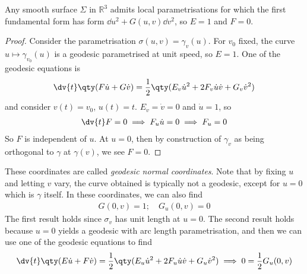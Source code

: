 \begin{corollary}
	Any smooth surface $\Sigma$ in $\mathbb R^3$ admits local parametrisations for which the first fundamental form has form $\dd{u}^2 + G(u,v) \dd{v}^2$, so $E = 1$ and $F = 0$.
\end{corollary}
\begin{proof}
	Consider the parametrisation $\sigma(u,v) = \gamma_v(u)$.
	For $v_0$ fixed, the curve $u \mapsto \gamma_{v_0}(u)$ is a geodesic parametrised at unit speed, so $E = 1$.
	One of the geodesic equations is
	\begin{align*}
		\dv{t} \qty(F \dot u + G \dot v) = \frac{1}{2} \qty(E_v \dot u^2 + 2F_v \dot u \dot v + G_v \dot v^2)
	\end{align*}
	and consider $v(t) = v_0$, $u(t) = t$.
	$E_v = \dot v = 0$ and $\dot u = 1$, so
	\begin{align*}
		\dv{t} F = 0 \implies F_u \dot u = 0 \implies F_u = 0
	\end{align*}
	So $F$ is independent of $u$.
	At $u = 0$, then by construction of $\gamma_v$ as being orthogonal to $\gamma$ at $\gamma(v)$, we see $F = 0$.
\end{proof}
These coordinates are called \textit{geodesic normal coordinates}.
Note that by fixing $u$ and letting $v$ vary, the curve obtained is typically not a geodesic, except for $u = 0$ which is $\gamma$ itself.
In these coordinates, we can also find
\begin{align*}
	G(0,v) = 1;\quad G_u(0,v) = 0
\end{align*}
The first result holds since $\sigma_v$ has unit length at $u = 0$.
The second result holds because $u = 0$ yields a geodesic with arc length parametrisation, and then we can use one of the geodesic equations to find
\begin{align*}
	\dv{t} \qty(E \dot u + F \dot v) = \frac{1}{2}\qty(E_u \dot u^2 + 2F_u \dot u \dot v + G_u \dot v^2) \implies 0 = \frac{1}{2} G_u(0,v)
\end{align*}

